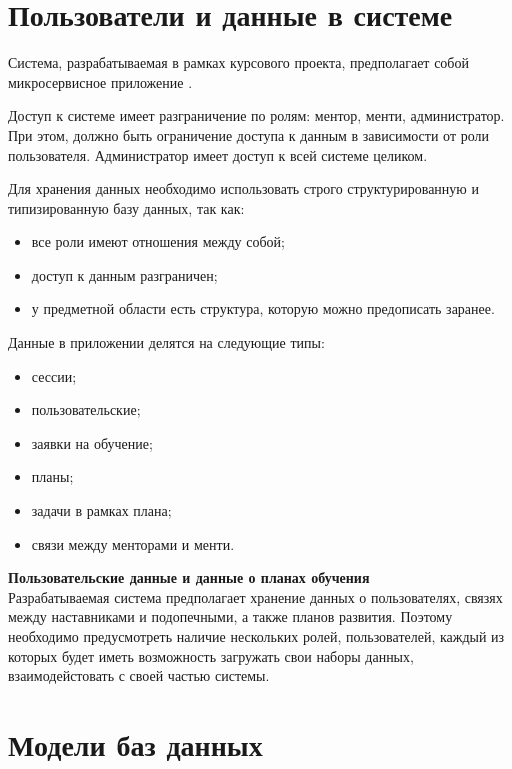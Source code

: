 
\newpage
\section{Пользователи и данные в системе}

Система, разрабатываемая в рамках курсового проекта, предполагает собой микросервисное приложение \cite{microservice}.

Доступ к системе имеет разграничение по ролям: ментор, менти, администратор. При этом, должно быть ограничение доступа к данным в зависимости от роли пользователя.  
Администратор имеет доступ к всей системе целиком.

Для хранения данных необходимо использовать строго структурированную и типизированную базу данных, так как:
\begin{itemize}
	\item все роли имеют отношения между собой;
	\item доступ к данным разграничен;
	\item у предметной области есть структура, которую можно предописать заранее.  
\end{itemize}


Данные в приложении делятся на следующие типы:

\begin{itemize}
    \item сессии;
    \item пользовательские;
    \item заявки на обучение;
    \item планы;
    \item задачи в рамках плана;
    \item связи между менторами и менти.
\end{itemize}

\noindent\textbf{Пользовательские данные и данные о планах обучения}\\
Разрабатываемая система предполагает хранение данных о пользователях, связях между наставниками и подопечными, а также планов развития.
Поэтому необходимо предусмотреть наличие нескольких ролей, пользователей, каждый из которых будет
иметь возможность загружать свои наборы данных, взаимодейстовать с своей частью системы.

\section{Модели баз данных}

